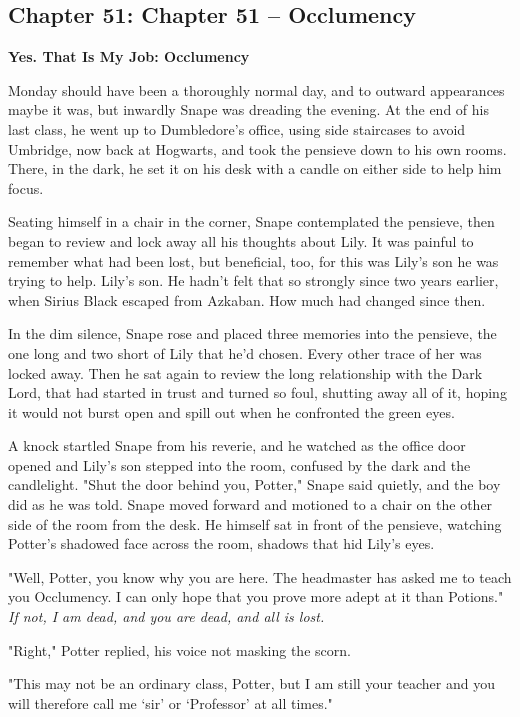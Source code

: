 \documentclass[a4paper,11pt]{article}
\begin{document}
\subsection{Chapter 51: Chapter 51 – Occlumency}

\textbf{Yes. That Is My Job: Occlumency}

Monday should have been a thoroughly normal day, and to outward appearances maybe it was, but inwardly Snape was dreading the evening. At the end of his last class, he went up to Dumbledore's office, using side staircases to avoid Umbridge, now back at Hogwarts, and took the pensieve down to his own rooms. There, in the dark, he set it on his desk with a candle on either side to help him focus.

Seating himself in a chair in the corner, Snape contemplated the pensieve, then began to review and lock away all his thoughts about Lily. It was painful to remember what had been lost, but beneficial, too, for this was Lily's son he was trying to help. Lily's son. He hadn't felt that so strongly since two years earlier, when Sirius Black escaped from Azkaban. How much had changed since then.

In the dim silence, Snape rose and placed three memories into the pensieve, the one long and two short of Lily that he'd chosen. Every other trace of her was locked away. Then he sat again to review the long relationship with the Dark Lord, that had started in trust and turned so foul, shutting away all of it, hoping it would not burst open and spill out when he confronted the green eyes.

A knock startled Snape from his reverie, and he watched as the office door opened and Lily's son stepped into the room, confused by the dark and the candlelight. "Shut the door behind you, Potter," Snape said quietly, and the boy did as he was told. Snape moved forward and motioned to a chair on the other side of the room from the desk. He himself sat in front of the pensieve, watching Potter's shadowed face across the room, shadows that hid Lily's eyes.

"Well, Potter, you know why you are here. The headmaster has asked me to teach you Occlumency. I can only hope that you prove more adept at it than Potions." \emph{If not, I am dead, and you are dead, and all is lost.}

"Right," Potter replied, his voice not masking the scorn.

"This may not be an ordinary class, Potter, but I am still your teacher and you will therefore call me `sir' or `Professor' at all times."
\end{document}
